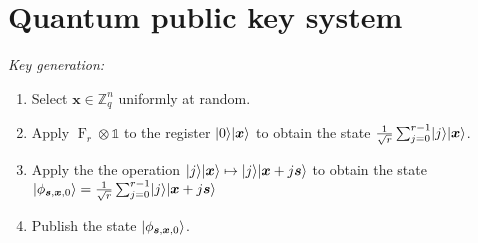 \documentclass[11pt]{article}
\theoremstyle{plain}
\theoremstyle{definition}
\DeclareMathOperator{\qft}{F}
\DeclareMathOperator{\E}{\mathbb{E}}
\DeclarePairedDelimiter{\ldbrac}{\lvert}{\rangle}
\def\Z{\ensuremath{\mathbb{Z}}}
\begin{document}






\section{Quantum public key system}


\textit{Key generation:}

\begin{enumerate}[topsep = 1pt, itemsep = 1pt, parsep = 1pt]
\item Select $\bm{x} \in \Z_q^n$ uniformly at random.
\item Apply $\qft_r \otimes \mathds{1}$ to the register $\ldbrac{0} \ldbrac{\bm{x}}$ to obtain the state $\frac{1}{\sqrt{r}} \sum_{j = 0}^{r - 1} \ldbrac{j} \ldbrac{\bm{x}}$.
\item Apply the the operation $\ldbrac{j}\ldbrac{\bm{x}} \mapsto \ldbrac{j}\ldbrac{\bm{x} + j\bm{s}}$ to obtain the state $\ldbrac{\phi_{\bm{s}, \bm{x}, 0}} = \frac{1}{\sqrt{r}} \sum_{j = 0}^{r - 1} \ldbrac{j} \ldbrac{\bm{x} + j\bm{s}}$
\item Publish the state $\ldbrac{\phi_{\bm{s}, \bm{x}, 0}}$.     
\end{enumerate}
\end{document}
